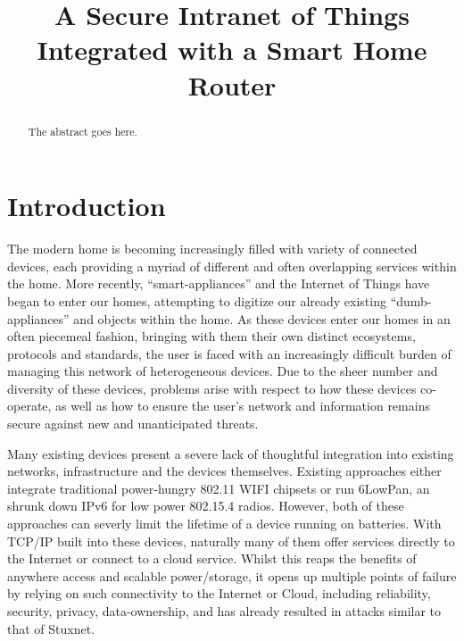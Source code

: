 \documentclass[conference]{./sty/IEEEtran}
\begin{document}
%
\title{A Secure Intranet of Things\\ Integrated with a Smart Home Router}


\author{
}

\maketitle


\begin{abstract}
The abstract goes here.
\end{abstract}


\section{Introduction}
The modern home is becoming increasingly filled with variety of connected devices, each providing a myriad of different and often overlapping services within the home. More recently, ``smart-appliances'' and the Internet of Things have began to enter our homes, attempting to digitize our already existing ``dumb-appliances'' and objects within the home. As these devices enter our homes in an often piecemeal fashion, bringing with them their own distinct ecosystems, protocols and standards, the user is faced with an increasingly difficult burden of managing this network of heterogeneous devices. Due to the sheer number and diversity of these devices, problems arise with respect to how these devices co-operate, as well as how to ensure the user's network and information remains secure against new and unanticipated threats.

Many existing devices present a severe lack of thoughtful integration into existing networks, infrastructure and the devices themselves. Existing approaches either integrate traditional power-hungry 802.11 WIFI chipsets or run 6LowPan, an shrunk down IPv6 for low power 802.15.4 radios. However, both of these approaches can severly limit the lifetime of a device running on batteries. With TCP/IP built into these devices, naturally many of them offer services directly to the Internet\cite{MQTT,IETF_CORE,Xively} or connect to a cloud service\cite{SmartThings,Twine}. Whilst this reaps the benefits of anywhere access and scalable power/storage, it opens up multiple points of failure by relying on such connectivity to the Internet or Cloud, including reliability, security, privacy, data-ownership, and has already resulted in attacks similar to that of Stuxnet\cite{IoTWorm}.
\end{document}
